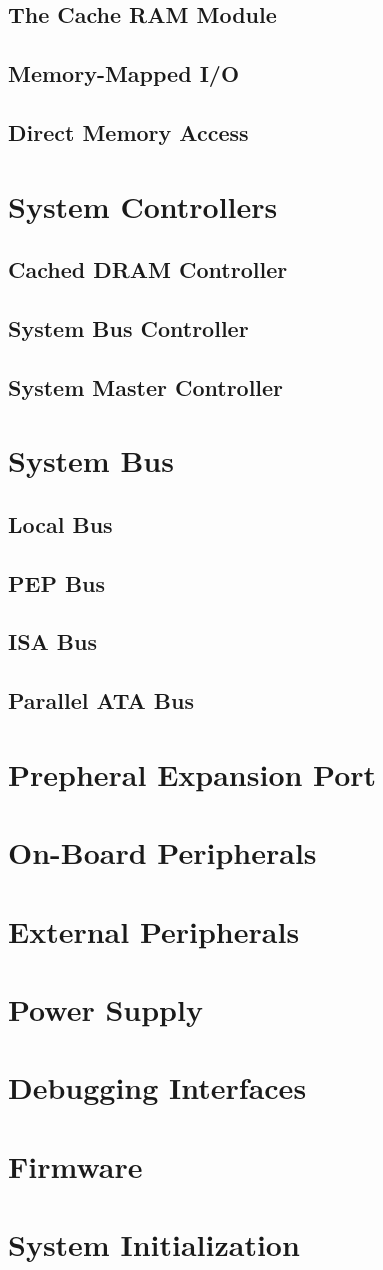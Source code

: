 \documentclass[11pt]{report}
\begin{document}
\section{The Cache RAM Module}
\section{Memory-Mapped I/O}
\section{Direct Memory Access}
\chapter{System Controllers}
\section{Cached DRAM Controller}
\section{System Bus Controller}
\section{System Master Controller}
\chapter{System Bus}
\section{Local Bus}
\section{PEP Bus}
\section{ISA Bus}
\section{Parallel ATA Bus}
\chapter{Prepheral Expansion Port}
\chapter{On-Board Peripherals}
\chapter{External Peripherals}
\chapter{Power Supply}
\chapter{Debugging Interfaces}
\chapter{Firmware}
\chapter{System Initialization}
\end{document}
